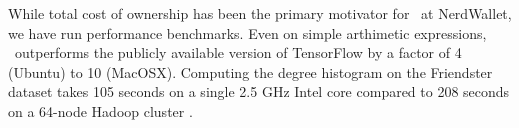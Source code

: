 While total cost of ownership has been the primary motivator for \Q\ at
NerdWallet, we have run performance benchmarks. Even on simple arthimetic
expressions, \Q\ outperforms the publicly available version of TensorFlow
\cite{Tensorflow2016} by a factor of 4 (Ubuntu) to 10 (MacOSX). Computing the
degree histogram on the Friendster dataset takes 105 seconds on a single 2.5 GHz
Intel core compared to 208 seconds on a 64-node Hadoop cluster \cite{Lim2015}.

